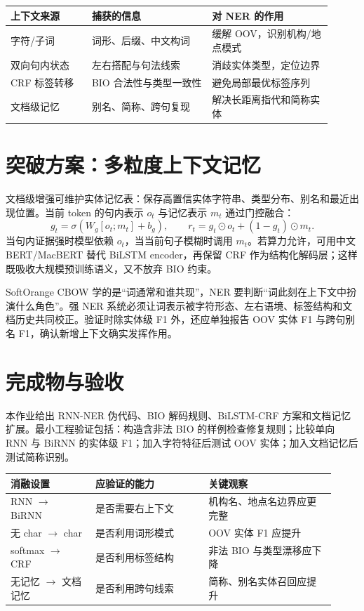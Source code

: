 \documentclass[UTF8,10pt,a4paper,fontset=none]{ctexart}
\begin{document}
\small
\begin{tabular}{@{}p{0.23\linewidth}p{0.34\linewidth}p{0.34\linewidth}@{}}
\toprule
上下文来源 & 捕获的信息 & 对 NER 的作用 \\
\midrule
字符/子词 & 词形、后缀、中文构词 & 缓解 OOV，识别机构/地点模式 \\
双向句内状态 & 左右搭配与句法线索 & 消歧实体类型，定位边界 \\
CRF 标签转移 & BIO 合法性与类型一致性 & 避免局部最优标签序列 \\
文档级记忆 & 别名、简称、跨句复现 & 解决长距离指代和简称实体 \\
\bottomrule
\end{tabular}
\normalsize

\section{突破方案：多粒度上下文记忆}
文档级增强可维护实体记忆表：保存高置信实体字符串、类型分布、别名和最近出现位置。当前 token 的句内表示 $o_t$ 与记忆表示 $m_t$ 通过门控融合：
\[
g_t=\sigma(W_g[o_t;m_t]+b_g),\qquad
r_t=g_t\odot o_t+(1-g_t)\odot m_t.
\]
当句内证据强时模型依赖 $o_t$，当当前句子模糊时调用 $m_t$。若算力允许，可用中文 BERT/MacBERT 替代 BiLSTM encoder，再保留 CRF 作为结构化解码层；这样既吸收大规模预训练语义，又不放弃 BIO 约束。

\begin{note}[最终判断]{SoftOrange}
CBOW 学的是“词通常和谁共现”，NER 要判断“词此刻在上下文中扮演什么角色”。强 NER 系统必须让词表示被字符形态、左右语境、标签结构和文档历史共同校正。验证时除实体级 F1 外，还应单独报告 OOV 实体 F1 与跨句别名 F1，确认新增上下文确实发挥作用。
\end{note}

\section{完成物与验收}
本作业给出 RNN-NER 伪代码、BIO 解码规则、BiLSTM-CRF 方案和文档记忆扩展。最小工程验证包括：构造含非法 BIO 的样例检查修复规则；比较单向 RNN 与 BiRNN 的实体级 F1；加入字符特征后测试 OOV 实体；加入文档记忆后测试简称识别。

\small
\begin{tabular}{@{}p{0.24\linewidth}p{0.32\linewidth}p{0.36\linewidth}@{}}
\toprule
消融设置 & 应验证的能力 & 关键观察 \\
\midrule
RNN $\rightarrow$ BiRNN & 是否需要右上下文 & 机构名、地点名边界应更完整 \\
无 char $\rightarrow$ char & 是否利用词形模式 & OOV 实体 F1 应提升 \\
softmax $\rightarrow$ CRF & 是否利用标签结构 & 非法 BIO 与类型漂移应下降 \\
无记忆 $\rightarrow$ 文档记忆 & 是否利用跨句线索 & 简称、别名实体召回应提升 \\
\bottomrule
\end{tabular}
\normalsize
\end{document}
